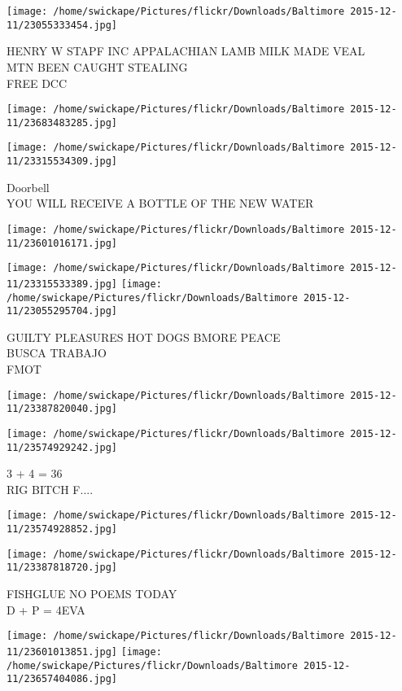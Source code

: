 \documentclass[10pt,letterpaper]{article}
\begin{document}
\texttt{[image: /home/swickape/Pictures/flickr/Downloads/Baltimore 2015-12-11/23055333454.jpg]}

HENRY W STAPF INC APPALACHIAN LAMB MILK MADE VEAL\\
MTN BEEN CAUGHT STEALING\\
FREE DCC
\pagebreak

\texttt{[image: /home/swickape/Pictures/flickr/Downloads/Baltimore 2015-12-11/23683483285.jpg]}

\vspace{0.25in}
\texttt{[image: /home/swickape/Pictures/flickr/Downloads/Baltimore 2015-12-11/23315534309.jpg]}

Doorbell\\
YOU WILL RECEIVE A BOTTLE OF THE NEW WATER
\pagebreak

\texttt{[image: /home/swickape/Pictures/flickr/Downloads/Baltimore 2015-12-11/23601016171.jpg]}

\vspace{0.25in}
\texttt{[image: /home/swickape/Pictures/flickr/Downloads/Baltimore 2015-12-11/23315533389.jpg]}
\texttt{[image: /home/swickape/Pictures/flickr/Downloads/Baltimore 2015-12-11/23055295704.jpg]}

GUILTY PLEASURES HOT DOGS BMORE PEACE\\
BUSCA TRABAJO\\
FMOT
\pagebreak

\texttt{[image: /home/swickape/Pictures/flickr/Downloads/Baltimore 2015-12-11/23387820040.jpg]}

\vspace{0.25in}
\texttt{[image: /home/swickape/Pictures/flickr/Downloads/Baltimore 2015-12-11/23574929242.jpg]}

3 + 4 = 36\\
RIG BITCH F....
\pagebreak

\texttt{[image: /home/swickape/Pictures/flickr/Downloads/Baltimore 2015-12-11/23574928852.jpg]}

\vspace{0.25in}
\texttt{[image: /home/swickape/Pictures/flickr/Downloads/Baltimore 2015-12-11/23387818720.jpg]}

FISHGLUE NO POEMS TODAY\\
D + P = 4EVA
\pagebreak

\texttt{[image: /home/swickape/Pictures/flickr/Downloads/Baltimore 2015-12-11/23601013851.jpg]}
\texttt{[image: /home/swickape/Pictures/flickr/Downloads/Baltimore 2015-12-11/23657404086.jpg]}
\end{document}
